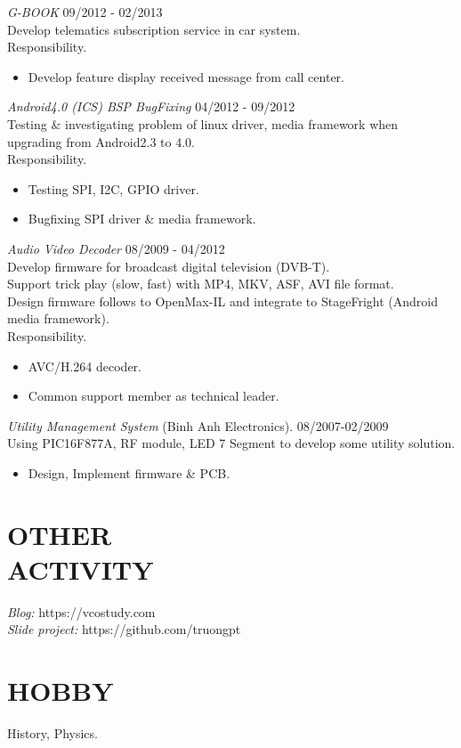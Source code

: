 \documentclass[margin]{res}
\begin{document}
\begin{resume}
                {\sl G-BOOK} \hfill            09/2012 - 02/2013 \\
		 Develop telematics subscription service in car system.\\
		 Responsibility.
                 \begin{itemize}  \itemsep -2pt %
                 \item Develop feature display received message from call center.
                 \end{itemize}

                {\sl Android4.0 (ICS) BSP BugFixing} \hfill            04/2012 - 09/2012\\
		 Testing \& investigating problem of linux driver, media framework when upgrading from Android2.3 to 4.0.\\
		 Responsibility.
                 \begin{itemize}  \itemsep -2pt %
                 \item Testing SPI, I2C, GPIO driver.
                 \item Bugfixing SPI driver \& media framework.
                 \end{itemize}

                {\sl Audio Video Decoder} \hfill            08/2009 - 04/2012 \\
                 Develop firmware for broadcast digital television (DVB-T).\\
                 Support trick play (slow, fast) with MP4, MKV, ASF, AVI file format.\\
                 Design firmware follows to OpenMax-IL and integrate to StageFright (Android media framework).\\
		 Responsibility.
                 \begin{itemize}  \itemsep -2pt %
                 \item AVC/H.264 decoder.
                 \item Common support member as technical leader.
        	 \end{itemize}


                {\sl Utility Management System} (Binh Anh Electronics). \hfill        08/2007-02/2009 \\
                Using PIC16F877A, RF module, LED 7 Segment to develop some utility solution.
                \begin{itemize}
                \item Design, Implement firmware \& PCB.
                \end{itemize} 
 
\section{OTHER \\ ACTIVITY}  
		{\sl Blog:} https://vcostudy.com \\
		{\sl Slide project:} https://github.com/truongpt

\section{HOBBY}  History, Physics.


\end{resume}
\end{document}
